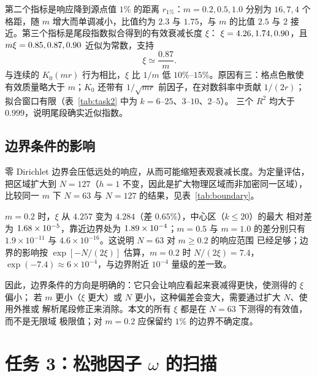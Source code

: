 \documentclass[UTF8,fontset=windows,a4paper,11pt]{ctexart}
\begin{document}
第二个指标是响应降到源点值 $1\%$ 的距离 $r_{1\%}$：$m=0.2,0.5,1.0$ 分别为
$16,7,4$ 个格距，随 $m$ 增大而单调减小，比值约为 $2.3$ 与 $1.75$，与 $m$ 的比值
$2.5$ 与 $2$ 接近。第三个指标是尾段指数拟合得到的有效衰减长度 $\xi$：
$\xi=4.26,1.74,0.90$，且 $m\xi=0.85,0.87,0.90$ 近似为常数，支持
\begin{equation}
\xi\simeq\frac{0.87}{m}.
\label{eq:xi}
\end{equation}
与连续的 $K_0(mr)$ 行为相比，$\xi$ 比 $1/m$ 低 $10\%$--$15\%$。原因有三：格点色散使
有效质量略大于 $m$；$K_0$ 还带有 $1/\sqrt{mr}$ 前因子，在对数斜率中贡献 $1/(2r)$；
拟合窗口有限（表~\ref{tab:task2} 中为 $k=6$--$25$、$3$--$10$、$2$--$5$）。
三个 $R^2$ 均大于 $0.999$，说明尾段确实近似指数。

\subsection{边界条件的影响}

零 Dirichlet 边界会压低远处的响应，从而可能缩短表观衰减长度。为定量评估，把区域扩大到
$N=127$（$h=1$ 不变，因此是扩大物理区域而非加密同一区域），比较同一 $m$ 下
$N=63$ 与 $N=127$ 的结果，见表~\ref{tab:boundary}。

\begin{table}[htbp]
\centering
\caption{边界条件影响：$N=63$ 与 $N=127$ 的对照。$\xi_{63}$、$\xi_{127}$ 使用相同的
拟合窗口；最后两列为两种网格上同一格点距离处 $u$ 的相对差（以 $N=127$ 的 $u_0$
归一）。}
\label{tab:boundary}
\small

\end{table}

$m=0.2$ 时，$\xi$ 从 $4.257$ 变为 $4.284$（差 $0.65\%$），中心区（$k\le20$）的最大
相对差为 $1.68\times10^{-5}$，靠近边界处为 $1.89\times10^{-4}$；$m=0.5$ 与 $m=1.0$ 的差分别只有
$1.9\times10^{-11}$ 与 $4.6\times10^{-16}$。这说明 $N=63$ 对 $m\ge0.2$ 的响应范围
已经足够；边界的影响按 $\exp[-N/(2\xi)]$ 估算，$m=0.2$ 时 $N/(2\xi)=7.4$，
$\exp(-7.4)\approx6\times10^{-4}$，与边界附近 $10^{-4}$ 量级的差一致。

因此，边界条件的方向是明确的：它只会让响应看起来衰减得更快，使测得的 $\xi$ 偏小；
若 $m$ 更小（$\xi$ 更大）或 $N$ 更小，这种偏差会变大，需要通过扩大 $N$、使用外推或
解析尾段修正来消除。本文的所有 $\xi$ 都是在 $N=63$ 下测得的有效值，而不是无限域
极限值；对 $m=0.2$ 应保留约 $1\%$ 的边界不确定度。

\section{任务 3：松弛因子 \texorpdfstring{$\omega$}{omega} 的扫描}
\label{sec:task3}
\end{document}
